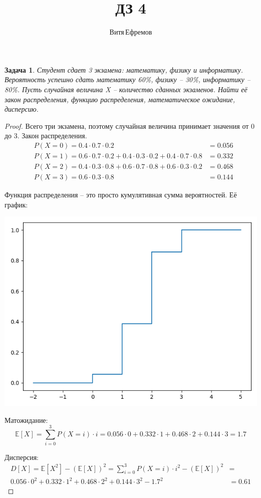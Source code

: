 \documentclass[a4paper,12pt]{article}
\newtheorem{problem}{Задача}
\newenvironment{solution}{\renewcommand{\proofname}{\unskip\indent\nopunct}\begin{proof}}{\end{proof}}
\begin{document}
\title{ДЗ 4}
\author{Витя\,Ефремов}
\maketitle

\begin{problem}
Студент сдает 3 экзамена: математику, физику и информатику.
Вероятность успешно сдать математику 60\%, физику – 30\%, информатику – 80\%.
Пусть случайная величина X – количество сданных экзаменов.
Найти её закон распределения, функцию распределения, математическое ожидание, дисперсию.
\end{problem}
\begin{solution}
Всего три экзамена, поэтому случайная величина принимает значения от 0 до 3.
Закон распределения.
\begin{align*}
& P(X=0) = 0.4 \cdot 0.7 \cdot 0.2 & = 0.056 \\
& P(X=1) = 0.6 \cdot 0.7 \cdot 0.2 +  0.4 \cdot 0.3 \cdot 0.2 + 0.4 \cdot 0.7 \cdot 0.8 & = 0.332 \\
& P(X=2) = 0.4 \cdot 0.3 \cdot 0.8 + 0.6 \cdot 0.7 \cdot 0.8 + 0.6 \cdot 0.3 \cdot 0.2 & = 0.468 \\
& P(X=3) = 0.6 \cdot 0.3 \cdot 0.8 & = 0.144
\end{align*}

Функция распределения -- это просто кумулятивная сумма вероятностей.
Её график:

\includegraphics[width=\textwidth]{hw_4.1}

Матожидание:
$$\mathbb E[X] = \sum_{i = 0}^{3} P(X=i) \cdot i = 0.056 \cdot 0 + 0.332 \cdot 1 + 0.468 \cdot 2 + 0.144 \cdot 3 = 1.7$$

Дисперсия:
\begin{align*}
D[X] = \mathbb E[X^2] - (\mathbb E[X])^2 = \sum_{i = 0}^{3} P(X=i) \cdot i^2 - (\mathbb E[X])^2 & = \\
0.056 \cdot 0^2 + 0.332 \cdot 1^2 + 0.468 \cdot 2^2 + 0.144 \cdot 3^2 - 1.7^2 & = 0.61
\end{align*}
\end{solution}
\end{document}
